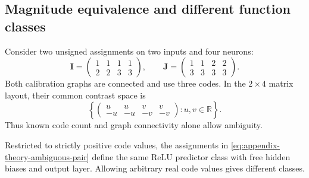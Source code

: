 \subsection{Magnitude equivalence and different function classes}
\label{app:theory-counterexample}

Consider two unsigned assignments on two inputs and four neurons:
\begin{equation}
    \mathbf I=
    \begin{pmatrix}
        1&1&1&1\\
        2&2&3&3
    \end{pmatrix},
    \qquad
    \mathbf J=
    \begin{pmatrix}
        1&1&2&2\\
        3&3&3&3
    \end{pmatrix}.
    \label{eq:appendix-theory-ambiguous-pair}
\end{equation}
Both calibration graphs are connected and use three codes.
In the $2\times4$ matrix layout, their common contrast space is
\begin{equation*}
    \left\{
    \begin{pmatrix}
        u&u&v&v\\
        -u&-u&-v&-v
    \end{pmatrix}
    :u,v\in\mathbb R
    \right\}.
\end{equation*}
Thus known code count and graph connectivity alone allow ambiguity.

\begin{proposition}
    \label{prop:theory-functional-counterexample}
    Restricted to strictly positive code values, the assignments in
    \eqref{eq:appendix-theory-ambiguous-pair} define the same
    ReLU predictor class with free hidden biases and output layer.
    Allowing arbitrary real code values gives different classes.
\end{proposition}

